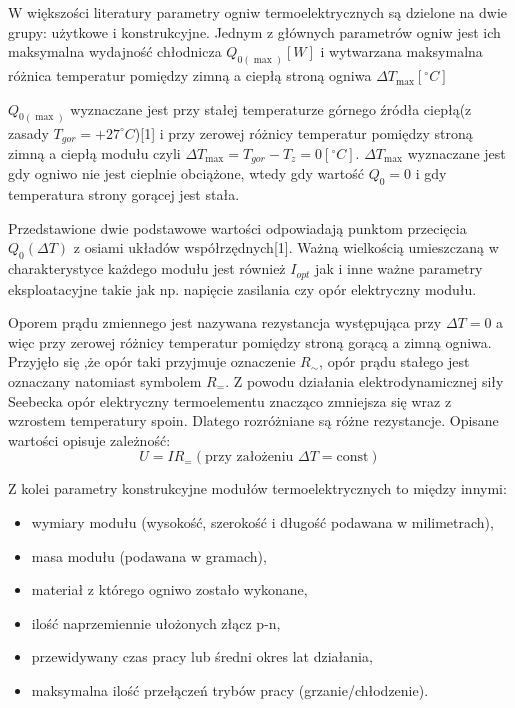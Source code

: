 \documentclass[oneside]{mgr}
\begin{document}
W większości literatury parametry ogniw termoelektrycznych są dzielone na dwie grupy: użytkowe i konstrukcyjne. Jednym z głównych parametrów ogniw jest ich maksymalna wydajność chłodnicza $Q_{0(\max)} [W]$ i wytwarzana maksymalna różnica temperatur pomiędzy zimną a ciepłą stroną ogniwa $\Delta T_{\max} [^{\circ} C]$

$Q_{0(\max)}$ wyznaczane jest przy stałej temperaturze górnego źródła ciepłą(z zasady $T_{gor}=+27^\circ C$)[1] i przy zerowej różnicy temperatur pomiędzy stroną zimną a ciepłą modułu czyli $\Delta T_{\max} = T_{gor} - T_z = 0 [^{\circ} C]$. $\Delta T_{\max}$ wyznaczane jest gdy ogniwo nie jest cieplnie obciążone, wtedy gdy wartość $Q_0 = 0$ i gdy temperatura strony gorącej jest stała.

Przedstawione dwie podstawowe wartości odpowiadają punktom przecięcia $Q_0 (\Delta T)$ z osiami układów współrzędnych[1]. Ważną wielkością umieszczaną w charakterystyce każdego modułu jest również $I_{opt}$ jak i inne ważne parametry eksploatacyjne takie jak np. napięcie zasilania czy opór elektryczny modułu.

Oporem prądu zmiennego jest nazywana rezystancja występująca przy $\Delta T = 0$ a więc przy zerowej różnicy temperatur pomiędzy stroną gorącą a zimną ogniwa. Przyjęło się ,że opór taki przyjmuje oznaczenie $R_\sim$, opór prądu stałego jest oznaczany natomiast symbolem $R_=$. Z powodu działania elektrodynamicznej siły Seebecka opór elektryczny termoelementu znacząco zmniejsza się wraz z wzrostem temperatury spoin. Dlatego rozróżniane są różne rezystancje. Opisane wartości opisuje zależność:
\begin{equation}
    U = IR_ = (\text{przy założeniu } \Delta T = \text{const})
\end{equation}

Z kolei parametry konstrukcyjne modułów termoelektrycznych to między innymi:
\begin{itemize}
    \item wymiary modułu (wysokość, szerokość i długość podawana w milimetrach),
    \item masa modułu (podawana w gramach),
    \item materiał z którego ogniwo zostało wykonane,
    \item ilość naprzemiennie ułożonych złącz p-n,
    \item przewidywany czas pracy lub średni okres lat działania,
    \item maksymalna ilość przełączeń trybów pracy (grzanie/chłodzenie).
\end{itemize}
\end{document}
